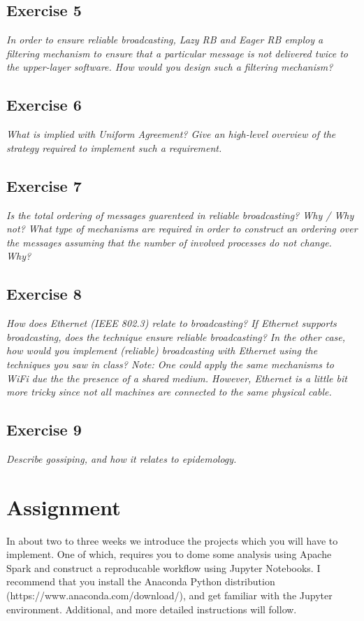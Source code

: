\subsection*{Exercise 5}
\label{sec:exercise_5}

\emph{In order to ensure reliable broadcasting, Lazy RB and Eager RB employ a filtering mechanism to ensure that a particular message is not delivered twice to the upper-layer software. How would you design such a filtering mechanism?}

\subsection*{Exercise 6}
\label{sec:exercise_6}

\emph{What is implied with Uniform Agreement? Give an high-level overview of the strategy required to implement such a requirement.}

\subsection*{Exercise 7}
\label{sec:exercise_7}

\emph{Is the total ordering of messages guarenteed in reliable broadcasting? Why / Why not? What type of mechanisms are required in order to construct an ordering over the messages assuming that the number of involved processes do not change. Why?}

\subsection*{Exercise 8}
\label{sec:exercise_8}

\emph{How does Ethernet (IEEE 802.3) relate to broadcasting? If Ethernet supports broadcasting, does the technique ensure reliable broadcasting? In the other case, how would you implement (reliable) broadcasting with Ethernet using the techniques you saw in class? Note: One could apply the same mechanisms to WiFi due the the presence of a shared medium. However, Ethernet is a little bit more tricky since not all machines are connected to the same physical cable.}

\subsection*{Exercise 9}
\label{sec:exercise_9}

\emph{Describe gossiping, and how it relates to epidemology.}

\section{Assignment}
\label{sec:assignment}

In about two to three weeks we introduce the projects which you will have to implement. One of which, requires you to dome some analysis using Apache Spark and construct a reproducable workflow using Jupyter Notebooks. I recommend that you install the Anaconda Python distribution (https://www.anaconda.com/download/), and get familiar with the Jupyter environment. Additional, and more detailed instructions will follow.


